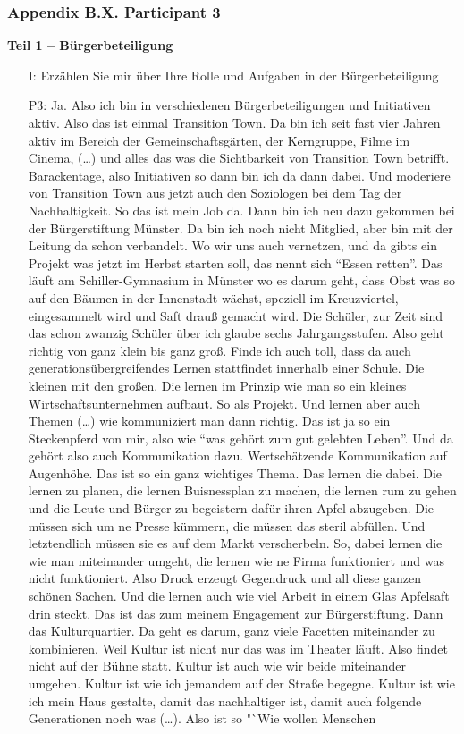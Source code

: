 \subsubsection{Appendix B.X. Participant 3}

\textbf{Teil 1 -- B{\"u}rgerbeteiligung}
\begin{itemize}
    \item[I:] Erz{\"a}hlen Sie mir {\"u}ber Ihre Rolle und Aufgaben in der B{\"u}rgerbeteiligung
    \item[P3:] Ja. Also ich bin in verschiedenen B{\"u}rgerbeteiligungen und Initiativen aktiv. Also das ist einmal Transition Town. Da bin ich seit fast vier Jahren aktiv im Bereich der Gemeinschaftsg{\"a}rten, der Kerngruppe, Filme im Cinema, (\dots) und alles das was die Sichtbarkeit von Transition Town betrifft. Barackentage, also Initiativen so dann bin ich da dann dabei. Und moderiere von Transition Town aus jetzt auch den Soziologen bei dem Tag der Nachhaltigkeit. So das ist mein Job da. Dann bin ich neu dazu gekommen bei der B{\"u}rgerstiftung M{\"u}nster. Da bin ich noch nicht Mitglied, aber bin mit der Leitung da schon verbandelt. Wo wir uns auch vernetzen, und da gibts ein Projekt was jetzt im Herbst starten soll, das nennt sich "`Essen retten"'. Das l{\"a}uft am Schiller-Gymnasium in M{\"u}nster wo es darum geht, dass Obst was so auf den B{\"a}umen in der Innenstadt w{\"a}chst, speziell im Kreuzviertel, eingesammelt wird und Saft drau{\ss} gemacht wird. Die Sch{\"u}ler, zur Zeit sind das schon zwanzig Sch{\"u}ler {\"u}ber ich glaube sechs Jahrgangsstufen. Also geht richtig von ganz klein bis ganz gro{\ss}. Finde ich auch toll, dass da auch generations{\"u}bergreifendes Lernen stattfindet innerhalb einer Schule. Die kleinen mit den gro{\ss}en. Die lernen im Prinzip wie man so ein kleines Wirtschaftsunternehmen aufbaut. So als Projekt. Und lernen aber auch Themen (\dots) wie kommuniziert man dann richtig. Das ist ja so ein Steckenpferd von mir, also wie "`was geh{\"o}rt zum gut gelebten Leben"'. Und da geh{\"o}rt also auch Kommunikation dazu. Wertsch{\"a}tzende Kommunikation auf Augenh{\"o}he. Das ist so ein ganz wichtiges Thema. Das lernen die dabei. Die lernen zu planen, die lernen Buisnessplan zu machen, die lernen rum zu gehen und die Leute und B{\"u}rger zu begeistern daf{\"u}r ihren Apfel abzugeben. Die m{\"u}ssen sich um ne Presse k{\"u}mmern, die m{\"u}ssen das steril abf{\"u}llen. Und letztendlich m{\"u}ssen sie es auf dem Markt verscherbeln. So, dabei lernen die wie man miteinander umgeht, die lernen wie ne Firma funktioniert und was nicht funktioniert. Also Druck erzeugt Gegendruck und all diese ganzen sch{\"o}nen Sachen. Und die lernen auch wie viel Arbeit in einem Glas Apfelsaft drin steckt. Das ist das zum meinem Engagement zur B{\"u}rgerstiftung. Dann das Kulturquartier. Da geht es darum, ganz viele Facetten miteinander zu kombinieren. Weil Kultur ist nicht nur das was im Theater l{\"a}uft. Also findet nicht auf der B{\"u}hne statt. Kultur ist auch wie wir beide miteinander umgehen. Kultur ist wie ich jemandem auf der Stra{\ss}e begegne. Kultur ist wie ich mein Haus gestalte, damit das nachhaltiger ist, damit auch folgende Generationen noch was (\dots). Also ist so "`Wie wollen Menschen 
\end{itemize}
